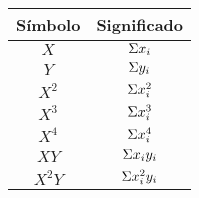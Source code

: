 \documentclass[11pt,letterpaper]{article}
\begin{document}
 \begin{table}[H]
 \centering
	\begin{tabular}{ c | c }
	\hline
	Símbolo & Significado  \\ \hline
	$X$ &	$\mathlarger{\Sigma} x_i$  \\ 
	$Y$ &   $\mathlarger{\Sigma} y_i$ \\
	$X^2$ & $\mathlarger{\Sigma} x_i^2$ \\
	$X^3$ & $\mathlarger{\Sigma }x_i^3$ \\ 
	$X^4$ & $\mathlarger{\Sigma} x_i^4$ \\
	$XY$ &  $\mathlarger{\Sigma} x_i y_i$	\\
	$X^2Y$& $\mathlarger{\Sigma} x^2_i y_i$	\\ \hline
	\end{tabular}
	\label{table:simbologia}
\end{table}
\end{document}
